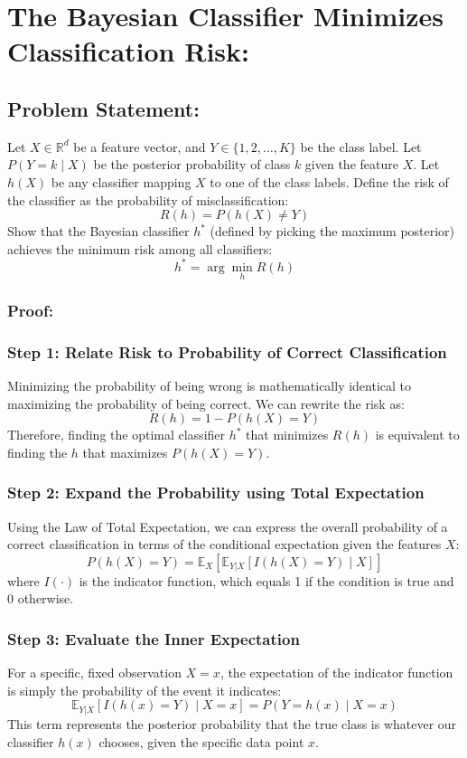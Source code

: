 \documentclass[twoside, 10pt]{article}
\begin{document}
\section{The Bayesian Classifier Minimizes Classification Risk:}
\subsection{Problem Statement:}
Let $X \in \mathbb{R}^d$ be a feature vector, and $Y \in \{1, 2, \dots, K\}$ be the class label. Let $P(Y = k \mid X)$ be the posterior probability of class $k$ given the feature $X$. Let $h(X)$ be any classifier mapping $X$ to one of the class labels. Define the risk of the classifier as the probability of misclassification:
\[
R(h) = P(h(X) \neq Y)
\]
Show that the Bayesian classifier $h^*$ (defined by picking the maximum posterior) achieves the minimum risk among all classifiers:
\[
h^* = \arg \min_h R(h)
\]
\subsubsection{Proof:}
\subsubsection*{Step 1: Relate Risk to Probability of Correct Classification}
Minimizing the probability of being wrong is mathematically identical to maximizing the probability of being correct. We can rewrite the risk as:
\[
R(h) = 1 - P(h(X) = Y)
\]
Therefore, finding the optimal classifier $h^*$ that minimizes $R(h)$ is equivalent to finding the $h$ that maximizes $P(h(X) = Y)$.
\subsubsection*{Step 2: Expand the Probability using Total Expectation}
Using the Law of Total Expectation, we can express the overall probability of a correct classification in terms of the conditional expectation given the features $X$:
\[
P(h(X) = Y) = \mathbb{E}_X [\mathbb{E}_{Y|X}[I(h(X) = Y) \mid X]]
\]
where $I(\cdot)$ is the indicator function, which equals 1 if the condition is true and 0 otherwise.
\subsubsection*{Step 3: Evaluate the Inner Expectation}
For a specific, fixed observation $X = x$, the expectation of the indicator function is simply the probability of the event it indicates:
\[
\mathbb{E}_{Y|X}[I(h(x) = Y) \mid X=x] = P(Y = h(x) \mid X=x)
\]
This term represents the posterior probability that the true class is whatever our classifier $h(x)$ chooses, given the specific data point $x$.
\end{document}
